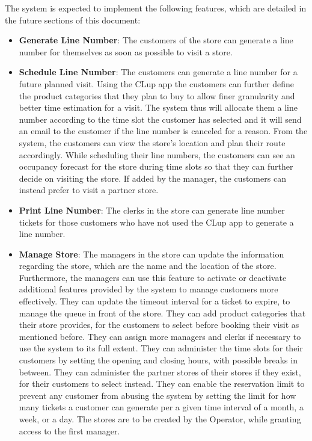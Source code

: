 The system is expected to implement the following features, which are detailed in the future sections of this document: \\
\begin{itemize}
    \item \textbf{Generate Line Number}: The customers of the store can generate a line number for themselves as soon as possible to visit a store.
    \item \textbf{Schedule Line Number}: The customers can generate a line number for a future planned visit.
    Using the CLup app the customers can further define the product categories that they plan to buy to allow finer granularity and better time estimation for a visit.
    The system thus will allocate them a line number according to the time slot the customer has selected and it will send an email to the customer if the line number is canceled for a reason.
    From the system, the customers can view the store's location and plan their route accordingly.
    While scheduling their line numbers, the customers can see an occupancy forecast for the store during time slots so that they can further decide on visiting the store.
    If added by the manager, the customers can instead prefer to visit a partner store.
    \item \textbf{Print Line Number}: The clerks in the store can generate line number tickets for those customers who have not used the CLup app to generate a line number.
    \item \textbf{Manage Store}: The managers in the store can update the information regarding the store, which are the name and the location of the store.
    Furthermore, the managers can use this feature to activate or deactivate additional features provided by the system to manage customers more effectively.
    They can update the timeout interval for a ticket to expire, to manage the queue in front of the store.
    They can add product categories that their store provides, for the customers to select before booking their visit as mentioned before.
    They can assign more managers and clerks if necessary to use the system to its full extent.
    They can administer the time slots for their customers by setting the opening and closing hours, with possible breaks in between.
    They can administer the partner stores of their stores if they exist, for their customers to select instead.
    They can enable the reservation limit to prevent any customer from abusing the system by setting the limit for how many tickets a customer can generate per a given time interval of a month, a week, or a day.
    The stores are to be created by the Operator, while granting access to the first manager.
\end{itemize}

